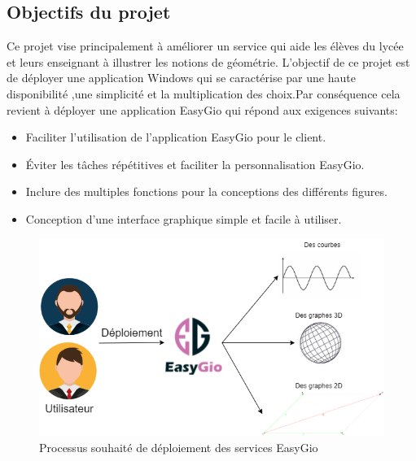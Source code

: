 \documentclass[a4paper]{report}
\begin{document}
\subsection{Objectifs du projet}
Ce projet vise principalement à améliorer un service qui aide les élèves du lycée et leurs enseignant à illustrer les notions de géométrie. L’objectif de ce projet est de déployer une application Windows qui se caractérise par une haute disponibilité ,une simplicité et la multiplication des choix.Par conséquence cela revient à déployer une application EasyGio qui répond aux exigences suivants:
\begin{itemize}
    \item Faciliter l'utilisation de l'application EasyGio pour le client.
    \item Éviter les tâches répétitives et faciliter la personnalisation EasyGio.
    \item Inclure des multiples fonctions pour la conceptions des différents figures.
    \item Conception d'une interface graphique simple et facile à utiliser.\\
\end{itemize}
\begin{figure}[!h]
    \centering
    \includegraphics[width=13cm]{images/EasyGioServices.png}
    \caption{Processus souhaité de déploiement des services EasyGio}
    \label{fig:Processus souhaité de déploiement des services EasyGio}
\end{figure}
\end{document}
